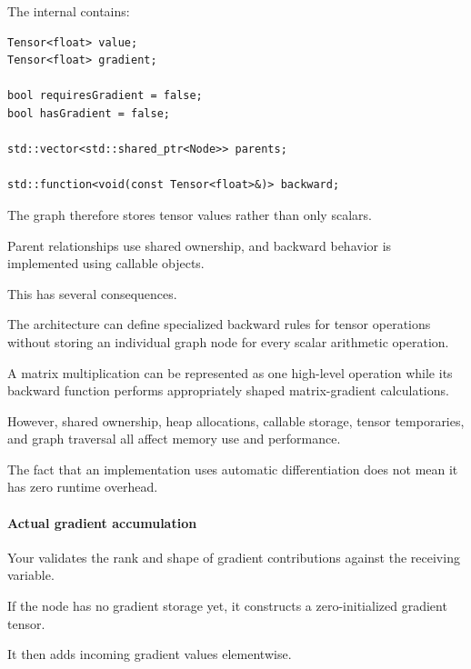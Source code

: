 \hypertarget{02-foundations-ii-ch022-graph-representation}{}

The internal  contains:

\begin{verbatim}
Tensor<float> value;
Tensor<float> gradient;

bool requiresGradient = false;
bool hasGradient = false;

std::vector<std::shared_ptr<Node>> parents;

std::function<void(const Tensor<float>&)> backward;
\end{verbatim}

The graph therefore stores tensor values rather than only scalars.

Parent relationships use shared ownership, and backward behavior is implemented using callable objects.

This has several consequences.

The architecture can define specialized backward rules for tensor operations without storing an individual graph node for every scalar arithmetic operation.

A matrix multiplication can be represented as one high-level operation while its backward function performs appropriately shaped matrix-gradient calculations.

However, shared ownership, heap allocations, callable storage, tensor temporaries, and graph traversal all affect memory use and performance.

The fact that an implementation uses automatic differentiation does not mean it has zero runtime overhead.

\paragraph{Actual gradient accumulation}\label{02-foundations-ii-ch022-actual-gradient-accumulation}

\hypertarget{02-foundations-ii-ch022-actual-gradient-accumulation}{}

Your  validates the rank and shape of gradient contributions against the receiving variable.

If the node has no gradient storage yet, it constructs a zero-initialized gradient tensor.

It then adds incoming gradient values elementwise.

